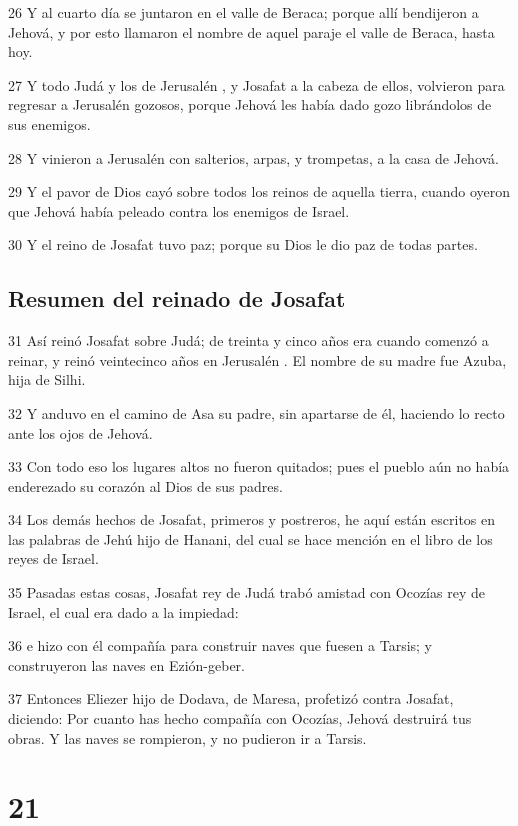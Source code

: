 \par 26 Y al cuarto día se juntaron en el valle de Beraca; porque allí bendijeron a Jehová, y por esto llamaron el nombre de aquel paraje el valle de Beraca, hasta hoy.
\par 27 Y todo Judá y los de Jerusalén , y Josafat a la cabeza de ellos, volvieron para regresar a Jerusalén  gozosos, porque Jehová les había dado gozo librándolos de sus enemigos.
\par 28 Y vinieron a Jerusalén  con salterios, arpas, y trompetas, a la casa de Jehová.
\par 29 Y el pavor de Dios cayó sobre todos los reinos de aquella tierra, cuando oyeron que Jehová había peleado contra los enemigos de Israel.
\par 30 Y el reino de Josafat tuvo paz; porque su Dios le dio paz de todas partes.

\section*{Resumen del reinado de Josafat}

\par 31 Así reinó Josafat sobre Judá; de treinta y cinco años era cuando comenzó a reinar, y reinó veintecinco años en Jerusalén . El nombre de su madre fue Azuba, hija de Silhi.
\par 32 Y anduvo en el camino de Asa su padre, sin apartarse de él, haciendo lo recto ante los ojos de Jehová.
\par 33 Con todo eso los lugares altos no fueron quitados; pues el pueblo aún no había enderezado su corazón al Dios de sus padres.
\par 34 Los demás hechos de Josafat, primeros y postreros, he aquí están escritos en las palabras de Jehú hijo de Hanani, del cual se hace mención en el libro de los reyes de Israel.
\par 35 Pasadas estas cosas, Josafat rey de Judá trabó amistad con Ocozías rey de Israel, el cual era dado a la impiedad:
\par 36 e hizo con él compañía para construir naves que fuesen a Tarsis; y construyeron las naves en Ezión-geber.
\par 37 Entonces Eliezer hijo de Dodava, de Maresa, profetizó contra Josafat, diciendo: Por cuanto has hecho compañía con Ocozías, Jehová destruirá tus obras. Y las naves se rompieron, y no pudieron ir a Tarsis.

\chapter{21}

